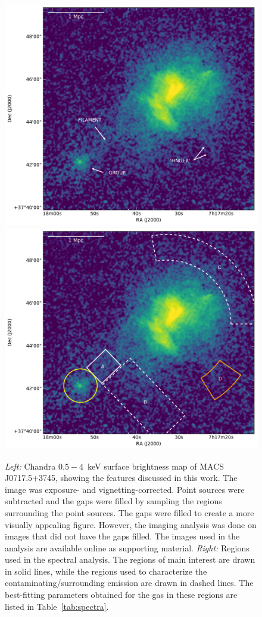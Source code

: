 \documentclass[11pt,a4paper,useAMS,iop]{emulateapj}
\begin{document}
\begin{figure}
    \includegraphics[width=\columnwidth]{plots/fil-labels.pdf}
    \includegraphics[width=\columnwidth]{plots/fil-regions.pdf}
    \caption{\emph{Left:} Chandra $0.5-4$~keV surface brightness map of MACS J0717.5+3745, showing the features discussed in this work. The image was exposure- and vignetting-corrected. Point sources were subtracted and the gaps were filled by sampling the regions surrounding the point sources. The gaps were filled to create a more visually appealing figure. However, the imaging analysis was done on images that did not have the gaps filled. The images used in the analysis are available online as supporting material. \emph{Right:} Regions used in the spectral analysis. The regions of main interest are drawn in solid lines, while the regions used to characterize the contaminating/surrounding emission are drawn in dashed lines. The best-fitting parameters obtained for the gas in these regions are listed in Table~\ref{tab:spectra}. \label{fig:fil}}
\end{figure}
\end{document}
